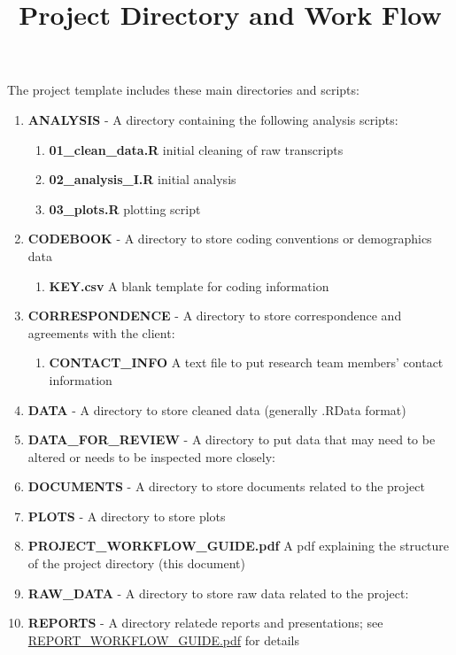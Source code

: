 \documentclass{article}\usepackage{graphicx, color}
\begin{document}
\title{Project Directory and Work Flow}
\author{}
\date{}
\maketitle

The project template includes these main directories and scripts:

\begin{enumerate}
  \item \textbf{ANALYSIS} - A directory containing the following analysis scripts:
  \begin{enumerate}
    \item \textbf{01\_clean\_data.R} initial cleaning of raw transcripts
    \item \textbf{02\_analysis\_I.R} initial analysis
    \item \textbf{03\_plots.R} plotting script
  \end{enumerate}
  \item \textbf{CODEBOOK} - A directory to store coding conventions or demographics data
  \begin{enumerate}
    \item \textbf{KEY.csv} A blank template for coding information
  \end{enumerate}  
  \item \textbf{CORRESPONDENCE} - A directory to store correspondence and agreements 
     with the client:
  \begin{enumerate}
     \item \textbf{CONTACT\_INFO} A text file to put research team members' 
       contact information
  \end{enumerate}  
  \item \textbf{DATA} - A directory to store cleaned data (generally .RData 
     format)
  \item \textbf{DATA\_FOR\_REVIEW} - A directory to put data that may need to be altered or needs to be inspected more closely:
  \item \textbf{DOCUMENTS} - A directory to store documents related to the project
  \item \textbf{PLOTS} - A directory to store plots
  \item \textbf{PROJECT\_WORKFLOW\_GUIDE.pdf} A pdf explaining the structure of the project directory (this document) 
  \item \textbf{RAW\_DATA} - A directory to store raw data related to the project: 
  \item \textbf{REPORTS} - A directory relatede reports and presentations; see \href{https://dl.dropbox.com/u/61803503/packages/REPORT_WORKFLOW_GUIDE.pdf}{REPORT\_WORKFLOW\_GUIDE.pdf} for details

\end{enumerate}
\end{document}
